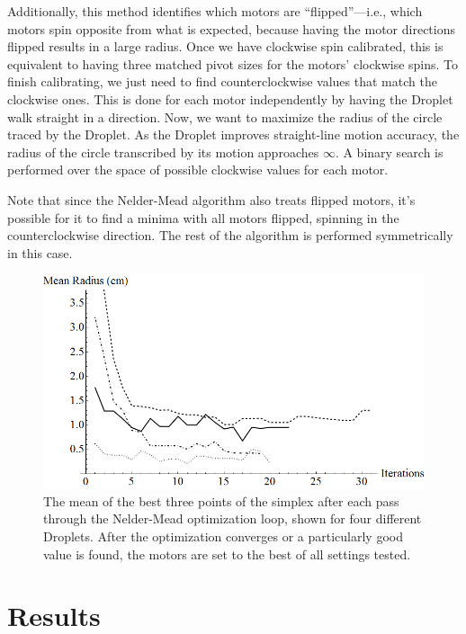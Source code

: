 \documentclass[letterpaper, 10pt, conference]{ieeeconf}
\begin{document}
Additionally, this method identifies which motors are ``flipped''---i.e., which motors spin opposite from what is expected, because having the motor directions flipped results in a large radius. Once we have clockwise spin calibrated, this is equivalent to having three matched pivot sizes for the motors' clockwise spins. To finish calibrating, we just need to find counterclockwise values that match the clockwise ones. This is done for each motor independently by having the Droplet walk straight in a direction. Now, we want to maximize the radius of  the circle traced by the Droplet. As the Droplet improves straight-line motion accuracy, the radius of the circle transcribed by its motion approaches $\infty$. A binary search is performed over the space of possible clockwise values for each motor.

Note that since the Nelder-Mead algorithm also treats flipped motors, it's possible for it to find a minima with all motors flipped, spinning in the counterclockwise direction. The rest of the algorithm is performed symmetrically in this case.

\begin{figure}[htb!]
\centering
\includegraphics[width=\linewidth]{Images/radiiConverging.png}
\caption{The mean of the best three points of the simplex after each pass through the Nelder-Mead optimization loop, shown for four different Droplets. After the optimization converges or a particularly good value is found, the motors are set to the best of all settings tested.}
\label{fig:radiiConverging}
\end{figure}

\section{Results}
\end{document}
